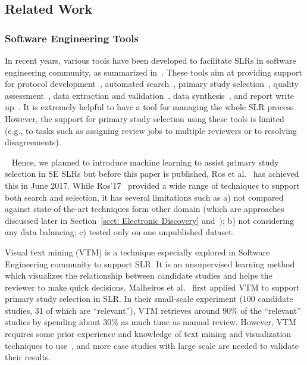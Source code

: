 \documentclass{svjour3}
\theoremstyle{break}
\newcommand{\respto}[1]{
\fcolorbox{black}{black!15}{
\label{response:#1}
\bf
  \scriptsize R-{#1}}~
}
\begin{document}
\subsection{Related Work}
\label{sect: Background}




\subsubsection{Software Engineering Tools}

In recent years, various tools have been developed to facilitate SLRs in software engineering community, as summarized in~\cite{marshall2015tools,marshall2014tools,marshall2013tools}. These tools aim at providing support for protocol development~\cite{Molleri:2015:SWA:2745802.2745825,fernandez2010slr,hernandes2012using}, automated search~\cite{Molleri:2015:SWA:2745802.2745825,hernandes2012using}, primary study selection~\cite{Molleri:2015:SWA:2745802.2745825,hernandes2012using,fernandez2010slr,bowes2012slurp}, quality assessment~\cite{fernandez2010slr,bowes2012slurp,Molleri:2015:SWA:2745802.2745825}, data extraction and validation~\cite{Molleri:2015:SWA:2745802.2745825,hernandes2012using,fernandez2010slr,bowes2012slurp}, data synthesis~\cite{Molleri:2015:SWA:2745802.2745825,hernandes2012using,fernandez2010slr,bowes2012slurp},
and report write up~\cite{Molleri:2015:SWA:2745802.2745825,hernandes2012using,fernandez2010slr,bowes2012slurp}. It is extremely helpful to have a tool for managing the whole SLR process. However, the support for primary study selection using these tools is limited (e.g., to tasks such as assigning review jobs to multiple reviewers or to resolving disagreements).
\respto{0e}Hence, we planned to introduce machine learning to assist primary study selection in SE SLRs but before this paper is published, Ros et al.~\cite{ros2017machine} has achieved this in June 2017. While Ros'17~\cite{ros2017machine} provided a wide range of techniques to support both search and selection, it has several limitations such as a) not compared against state-of-the-art techniques form other domain (which are approaches discussed later in Section~\ref{sect: Electronic Discovery} and~\cite{sect: Evidence-based Medicine}); b) not considering any data balancing; c) tested only on one unpublished dataset. 

Visual text mining (VTM) is a technique especially explored in Software Engineering community to support SLR. It is an unsupervised learning method which visualizes the relationship between candidate studies and helps the reviewer to make quick decisions. Malheiros et al.~\cite{malheiros2007visual} first applied VTM to support primary study selection in SLR. In their small-scale experiment (100 candidate studies, 31 of which are ``relevant''), VTM retrieves around 90\% of the ``relevant'' studies by spending about 30\% as much time as manual review. However, VTM requires some prior experience and knowledge of text mining and visualization techniques to use~\cite{bowes2012slurp}, and more case studies with large scale are needed to validate their results. 
\end{document}
